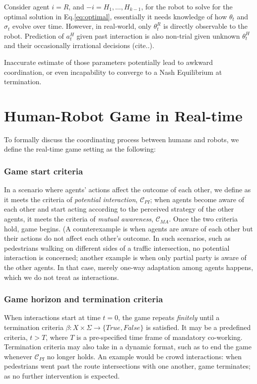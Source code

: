 \documentclass[letterpaper, 10 pt, conference]{ieeeconf}  %
\begin{document}
Consider agent 
$i=R$, and $-i=H_1,\ldots,H_{k-1}$, for the robot to solve for the optimal 
solution in Eq.\ref{eq:optimal}, essentially it needs knowledge of 
how $\theta_t$ and $\sigma_t$ evolve over time. However, in real-world, only 
$\theta^R_t$ is directly observable to the robot. Prediction of $a^H_t$ given 
past interaction is also non-trial given unknown $\theta^{H}_t$ and their 
occasionally irrational decisions (cite..).

Inaccurate estimate of those parameters potentially lead to awkward 
coordination, or even incapability to converge to a Nash Equilibrium at 
termination.

\section{Human-Robot Game in Real-time}\label{sec:game}
To formally discuss the coordinating process between humans and robots, we define the real-time game setting as the following: 
\subsubsection{Game start criteria}
In a scenario where agents' actions affect the outcome of each other, we define as it meets the criteria of \textit{potential interaction}, $\mathcal{C}_{PI}$; when agents become aware of each other and start acting according to the perceived strategy of the other agents, it meets the criteria of \textit{mutual awareness}, $\mathcal{C}_{MA}$. Once the two criteria hold, game begins. 
(A counterexample is when agents are aware of each other but their actions do not affect each other's outcome. In such scenarios, such as pedestrians walking on different sides of a traffic intersection, no potential interaction is concerned; another example is when only partial party is aware of the other agents. In that case, merely one-way adaptation among agents happens, which we do not treat as interactions.%
\subsubsection{Game horizon and termination criteria}
When interactions start at time $t=0$, the game repeats \textit{finitely} 
until a termination criteria 
$\beta: X \times \Sigma \rightarrow \{True,False\}$ is satisfied. It may be a 
predefined criteria, $t>T$, where $T$ is a pre-specified time frame of 
mandatory co-working. Termination criteria may also take in a dynamic format, 
such as to end the game whenever $\mathcal{C}_{PI}$ no longer holds. An 
example would be crowd interactions: when pedestrians went past the route 
intersections with one another, game terminates; as no further intervention is 
expected.
\end{document}
